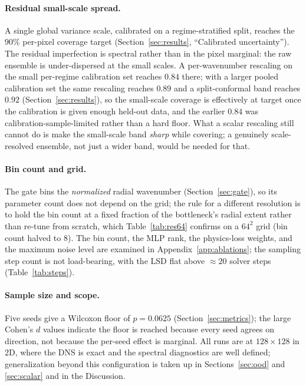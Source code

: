 \documentclass[10pt]{article} %
\begin{document}
\paragraph{Residual small-scale spread.} A single global variance scale, calibrated on a regime-stratified split, reaches the $90\%$ per-pixel coverage target (Section~\ref{sec:results}, ``Calibrated uncertainty''). The residual imperfection is spectral rather than in the pixel marginal: the raw ensemble is under-dispersed at the small scales. A per-wavenumber rescaling on the small per-regime calibration set reaches $0.84$ there; with a larger pooled calibration set the same rescaling reaches $0.89$ and a split-conformal band reaches $0.92$ (Section~\ref{sec:results}), so the small-scale coverage is effectively at target once the calibration is given enough held-out data, and the earlier $0.84$ was calibration-sample-limited rather than a hard floor. What a scalar rescaling still cannot do is make the small-scale band \emph{sharp} while covering; a genuinely scale-resolved ensemble, not just a wider band, would be needed for that.

\paragraph{Bin count and grid.} The gate bins the \emph{normalized} radial wavenumber (Section~\ref{sec:gate}), so its parameter count does not depend on the grid; the rule for a different resolution is to hold the bin count at a fixed fraction of the bottleneck's radial extent rather than re-tune from scratch, which Table~\ref{tab:res64} confirms on a $64^2$ grid (bin count halved to $8$). The bin count, the MLP rank, the physics-loss weights, and the maximum noise level are examined in Appendix~\ref{app:ablations}; the sampling step count is not load-bearing, with the LSD flat above $\approx 20$ solver steps (Table~\ref{tab:steps}).

\paragraph{Sample size and scope.} Five seeds give a Wilcoxon floor of $p = 0.0625$ (Section~\ref{sec:metrics}); the large Cohen's $d$ values indicate the floor is reached because every seed agrees on direction, not because the per-seed effect is marginal. All runs are at $128 \times 128$ in 2D, where the DNS is exact and the spectral diagnostics are well defined; generalization beyond this configuration is taken up in Sections~\ref{sec:ood} and \ref{sec:scalar} and in the Discussion.
\end{document}
